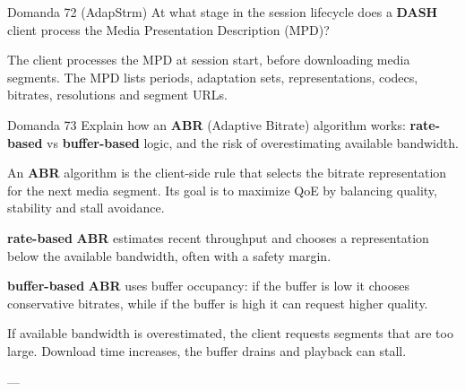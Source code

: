 \begin{questionbox}{Domanda 72}
(AdapStrm) At what stage in the session lifecycle does a \textbf{DASH} client process the Media Presentation Description (MPD)?
\end{questionbox}


The client processes the MPD at session start, before downloading media segments. The MPD lists periods, adaptation sets, representations, codecs, bitrates, resolutions and segment URLs.



\begin{questionbox}{Domanda 73}
Explain how an \textbf{ABR} (Adaptive Bitrate) algorithm works: \textbf{\textbf{rate}-based} vs \textbf{buffer-based} logic, and the risk of overestimating available bandwidth.
\end{questionbox}


An \textbf{ABR} algorithm is the client-side rule that selects the bitrate representation for the next media segment. Its goal is to maximize QoE by balancing quality, stability and stall avoidance.

\textbf{\textbf{rate}-based} \textbf{ABR} estimates recent throughput and chooses a representation below the available bandwidth, often with a safety margin.

\textbf{buffer-based} \textbf{ABR} uses buffer occupancy: if the buffer is low it chooses conservative bitrates, while if the buffer is high it can request higher quality.

If available bandwidth is overestimated, the client requests segments that are too large. Download time increases, the buffer drains and playback can stall.

---


